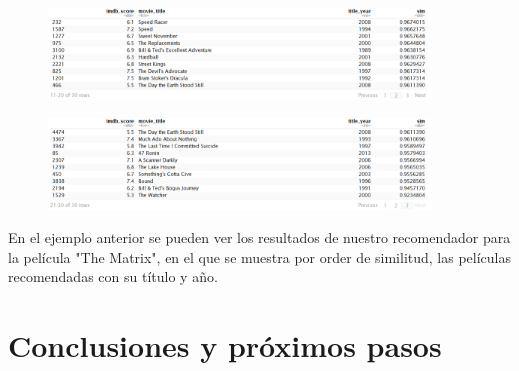 \documentclass{article}
\begin{document}
\begin{figure}[h]
\centering
\includegraphics[width=4in,clip,keepaspectratio]{./images/recommender2}
\end{figure}

\begin{figure}[h]
\centering
\includegraphics[width=4in,clip,keepaspectratio]{./images/recommender3}
\end{figure}

En el ejemplo anterior se pueden ver los resultados de nuestro recomendador para la película "The Matrix", en el que se muestra por order de similitud, las películas recomendadas con su título y año. 

\clearpage

\section{Conclusiones y próximos pasos}

\blindtext

\clearpage
\end{document}
